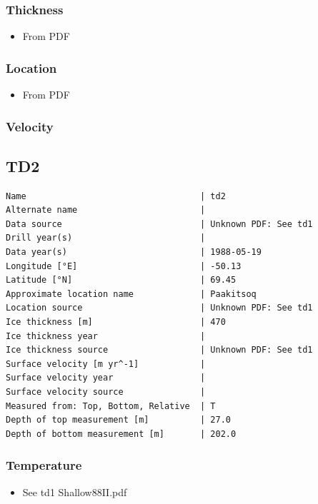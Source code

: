\documentclass[article,a4paper,times,11pt,twoside]{article}
\begin{document}
\subsubsection{Thickness}
\label{sec:org25a1acf}

\begin{itemize}
\item From PDF
\end{itemize}

\subsubsection{Location}
\label{sec:org1885109}

\begin{itemize}
\item From PDF
\end{itemize}

\subsubsection{Velocity}
\label{sec:orgb4e11c7}
\clearpage
\subsection{TD2}
\label{sec:org3e69e4c}
\begin{verbatim}
Name                                  | td2
Alternate name                        | 
Data source                           | Unknown PDF: See td1
Drill year(s)                         | 
Data year(s)                          | 1988-05-19
Longitude [°E]                        | -50.13
Latitude [°N]                         | 69.45
Approximate location name             | Paakitsoq
Location source                       | Unknown PDF: See td1
Ice thickness [m]                     | 470
Ice thickness year                    | 
Ice thickness source                  | Unknown PDF: See td1
Surface velocity [m yr^-1]            | 
Surface velocity year                 | 
Surface velocity source               | 
Measured from: Top, Bottom, Relative  | T
Depth of top measurement [m]          | 27.0
Depth of bottom measurement [m]       | 202.0
\end{verbatim}

\subsubsection{Temperature}
\label{sec:orgcb057fa}

\begin{itemize}
\item See td1 Shallow88II.pdf
\end{itemize}
\end{document}
